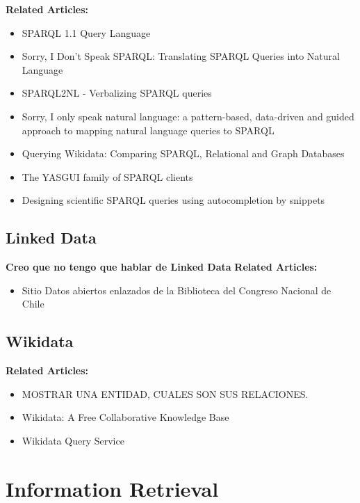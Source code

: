 \textbf{Related Articles:}
\begin{itemize}
    \item SPARQL 1.1 Query Language \cite{Sparql2012}
    \item Sorry, I Don’t Speak SPARQL: Translating SPARQL Queries into Natural Language \cite{Lehmann2013}
    \item SPARQL2NL - Verbalizing SPARQL queries \cite{Ngomo2013}
    \item Sorry, I only speak natural language: a pattern-based, data-driven and guided approach to mapping natural language queries to SPARQL \cite{Rico2015}
    \item Querying Wikidata: Comparing SPARQL, Relational and Graph Databases \cite{Hernandez2016}
    \item The YASGUI family of SPARQL clients \cite{Rietveld2016}
    \item Designing scientific SPARQL queries using autocompletion by snippets \cite{Rafes2018}
\end{itemize}

\subsection{Linked Data}
\textbf{Creo que no tengo que hablar de Linked Data}
\textbf{Related Articles:}
\begin{itemize}
    \item Sitio Datos abiertos enlazados de la Biblioteca del Congreso Nacional de Chile\cite{datosbcn}
\end{itemize}

\subsection{Wikidata}

\textbf{Related Articles:}
\begin{itemize}
    \item MOSTRAR UNA ENTIDAD, CUALES SON SUS RELACIONES.
    \item Wikidata: A Free Collaborative Knowledge Base \cite{Wikidata2014}
    \item Wikidata Query Service \cite{wikidataQueryService}
\end{itemize}

\section{Information Retrieval}

